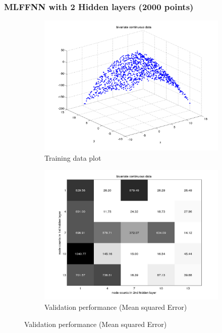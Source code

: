 \documentclass[fleqn]{article}
\begin{document}
\subsubsection{MLFFNN with 2 Hidden layers (2000 points)}

\begin{figure}[!ht]
\begin{subfigure}{.5\textwidth}
  \caption{Training data plot}
\includegraphics[scale=0.5]{pics/bivariate/dataPlot}
\end{subfigure}
\begin{subfigure}{.5\textwidth}
\caption{Validation performance (Mean squared Error)}
\includegraphics[scale=0.2]{pics/bivariate/bivariate continuous data_validationerror}
\end{subfigure}
\end{figure}
\end{document}
